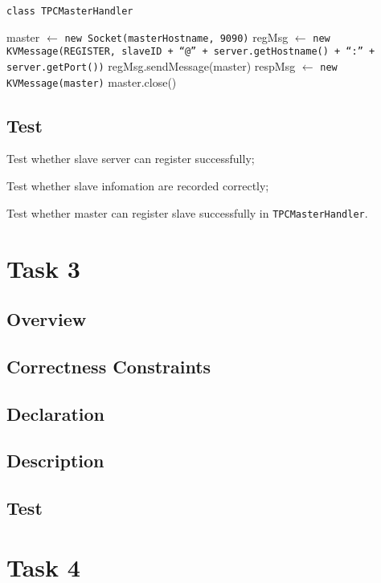\documentclass{article}
\begin{document}
\begin{algorithm}
	\caption{\texttt{class TPCMasterHandler}}
	\begin{algorithmic}
			\State master $\leftarrow$ \texttt{new Socket(masterHostname, 9090)}
			\State regMsg $\leftarrow$ \texttt{new KVMessage(REGISTER, slaveID + ``@'' + server.getHostname()
			+ ``:'' + server.getPort())}
			\State regMsg.sendMessage(master)
			\State respMsg $\leftarrow$ \texttt{new KVMessage(master)}
			\State master.close()
		\EndProcedure
	\end{algorithmic}
\end{algorithm}
\subsection{Test}
\begin{compactitem}
	\item Test whether slave server can register successfully;
	\item Test whether slave infomation are recorded correctly;
	\item Test whether master can register slave successfully in \texttt{TPCMasterHandler}.
\end{compactitem}

\section{Task 3}
\subsection{Overview}
\subsection{Correctness Constraints}
\subsection{Declaration}
\subsection{Description}
\subsection{Test}

\section{Task 4}
\end{document}
